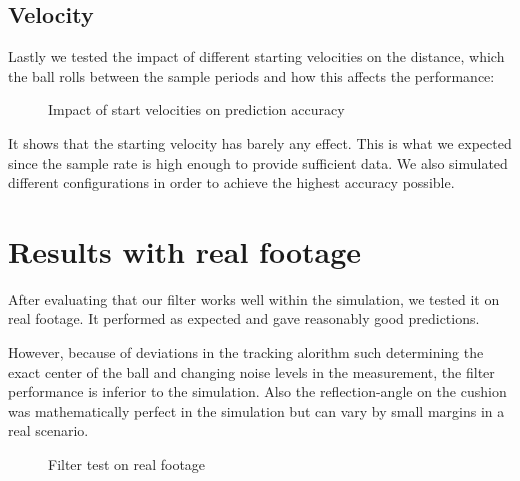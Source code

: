 \documentclass[notitlepage, a4paper, 11pt]{scrartcl}
\begin{document}
\begin{multicols}{2}
\subsection{Velocity}

Lastly we tested the impact of different starting velocities on the distance, which the ball rolls between the sample periods and how this affects the performance:

\begin{figure}[H]
    \centering
    \caption{Impact of start velocities on prediction accuracy}
    \label{fig:velocity300}
\end{figure}

It shows that the starting velocity has barely any effect. 
This is what we expected since the sample rate is high enough to provide sufficient data. 
We also simulated different configurations in order to achieve the highest accuracy possible.

\section{Results with real footage}

After evaluating that our filter works well within the simulation, we tested it on real footage. 
It performed as expected and gave reasonably good predictions.

However, because of deviations in the tracking alorithm such determining the exact center of the ball and changing noise levels in the measurement, 
the filter performance is inferior to the simulation. Also the reflection-angle on the cushion was mathematically perfect in the simulation
but can vary by small margins in a real scenario.

\begin{figure}[H]
    \centering
    \caption{Filter test on real footage}
    \label{fig:realfootage}
\end{figure}


\end{multicols}
\end{document}
